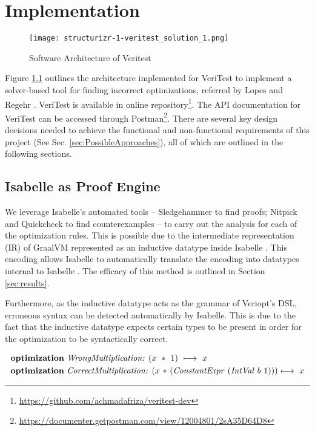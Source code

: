 \chapter{Implementation \label{sec:implementation}}

\begin{figure}[!htb]
    \centering
    \texttt{[image: structurizr-1-veritest\_solution\_1.png]}
    \caption{Software Architecture of Veritest}
    \label{fig:architecture}
\end{figure}

Figure \ref{fig:architecture} outlines the architecture implemented for VeriTest to implement a solver-based tool for finding incorrect optimizations,
referred by Lopes and Regehr \cite[p. 5]{CompilerOptimization}. 
VeriTest is available in online repository\footnote{\href{https://github.com/achmadafriza/veritest-dev}{https://github.com/achmadafriza/veritest-dev}}. 
The API documentation for VeriTest can be 
accessed through Postman\footnote{\href{https://documenter.getpostman.com/view/12004801/2sA35D64D8}{https://documenter.getpostman.com/view/12004801/2sA35D64D8}}.
There are several key design decisions needed to achieve the functional and 
non-functional requirements of this project (See Sec. \ref{sec:PossibleApproaches}), all of which are outlined in the following sections.

\section{Isabelle as Proof Engine}
\label{sec:ProofEngine}

We leverage Isabelle's automated tools -- Sledgehammer to find proofs; Nitpick and Quickcheck to find counterexamples --
to carry out the analysis for each of the optimization rules. This is possible due to the intermediate 
representation (IR) of GraalVM represented as an inductive datatype inside Isabelle \cite[Sec. 3]{ATVA21_GraalVM_IR_Semantics}. 
This encoding allows Isabelle to automatically translate the encoding into datatypes internal to Isabelle \cite{biendarra_ning_2024}.
The efficacy of this method is outlined in Section \ref{sec:results}.

Furthermore, as the inductive datatype acts as the grammar of Veriopt's DSL, erroneous syntax can be detected automatically by Isabelle.
This is due to the fact that the inductive datatype expects certain types to be present in order for the optimization to be syntactically correct.

\begin{align}
    &\text{\textbf{optimization} \emph{WrongMultiplication: \((x\ *\ 1)\ \longmapsto\ x\)}} \label{eq:MalformedRule} \\
    &\text{\textbf{optimization} \emph{CorrectMultiplication:} \((x\ *\) (\emph{ConstantExpr} (\emph{IntVal} \(b\ 1\)))) \(\longmapsto\ x\)} \label{eq:CorrectRule}
\end{align}

